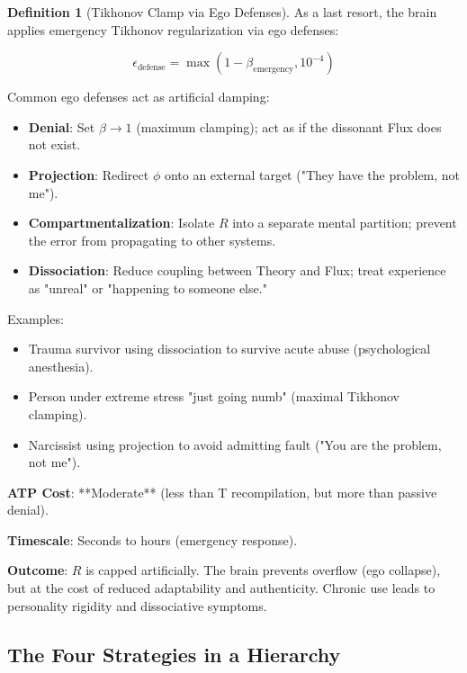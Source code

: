 \documentclass[11pt,oneside]{article}
\theoremstyle{definition}
\newtheorem{definition}[theorem]{Definition}
\begin{document}
\begin{definition}[Tikhonov Clamp via Ego Defenses]
As a last resort, the brain applies emergency Tikhonov regularization via ego defenses:

\[
\epsilon_{\text{defense}} = \max(1 - \beta_{\text{emergency}}, 10^{-4})
\]

Common ego defenses act as artificial damping:

\begin{itemize}
  \item \textbf{Denial}: Set $\beta \to 1$ (maximum clamping); act as if the dissonant Flux does not exist.
  \item \textbf{Projection}: Redirect $\phi$ onto an external target ("They have the problem, not me").
  \item \textbf{Compartmentalization}: Isolate $R$ into a separate mental partition; prevent the error from propagating to other systems.
  \item \textbf{Dissociation}: Reduce coupling between Theory and Flux; treat experience as "unreal" or "happening to someone else."
\end{itemize}
\end{definition}

Examples:
\begin{itemize}
  \item Trauma survivor using dissociation to survive acute abuse (psychological anesthesia).
  \item Person under extreme stress "just going numb" (maximal Tikhonov clamping).
  \item Narcissist using projection to avoid admitting fault ("You are the problem, not me").
\end{itemize}

\textbf{ATP Cost}: **Moderate** (less than T recompilation, but more than passive denial).

\textbf{Timescale}: Seconds to hours (emergency response).

\textbf{Outcome}: $R$ is capped artificially. The brain prevents overflow (ego collapse), but at the cost of reduced adaptability and authenticity. Chronic use leads to personality rigidity and dissociative symptoms.

\subsection{The Four Strategies in a Hierarchy}
\end{document}

